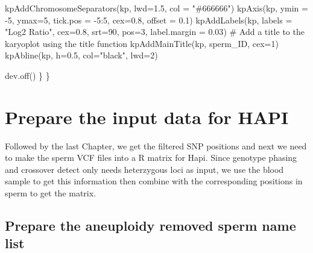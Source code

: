 \documentclass[
  letterpaper,
  DIV=11,
  numbers=noendperiod]{scrreprt}
\newenvironment{Shaded}{\begin{snugshade}}{\end{snugshade}}
\newcommand{\AttributeTok}[1]{\textcolor[rgb]{0.40,0.45,0.13}{#1}}
\newcommand{\CommentTok}[1]{\textcolor[rgb]{0.37,0.37,0.37}{#1}}
\newcommand{\DecValTok}[1]{\textcolor[rgb]{0.68,0.00,0.00}{#1}}
\newcommand{\FloatTok}[1]{\textcolor[rgb]{0.68,0.00,0.00}{#1}}
\newcommand{\FunctionTok}[1]{\textcolor[rgb]{0.28,0.35,0.67}{#1}}
\newcommand{\NormalTok}[1]{\textcolor[rgb]{0.00,0.23,0.31}{#1}}
\newcommand{\SpecialCharTok}[1]{\textcolor[rgb]{0.37,0.37,0.37}{#1}}
\newcommand{\StringTok}[1]{\textcolor[rgb]{0.13,0.47,0.30}{#1}}
\begin{document}
\begin{codelisting}
\begin{Shaded}
\begin{Highlighting}[]
  \FunctionTok{kpAddChromosomeSeparators}\NormalTok{(kp, }\AttributeTok{lwd=}\FloatTok{1.5}\NormalTok{, }\AttributeTok{col =} \StringTok{"\#666666"}\NormalTok{)}
  \FunctionTok{kpAxis}\NormalTok{(kp, }\AttributeTok{ymin =} \SpecialCharTok{{-}}\DecValTok{5}\NormalTok{, }\AttributeTok{ymax=}\DecValTok{5}\NormalTok{, }\AttributeTok{tick.pos =} \SpecialCharTok{{-}}\DecValTok{5}\SpecialCharTok{:}\DecValTok{5}\NormalTok{, }\AttributeTok{cex=}\FloatTok{0.8}\NormalTok{, }\AttributeTok{offset =} \FloatTok{0.1}\NormalTok{)}
  \FunctionTok{kpAddLabels}\NormalTok{(kp, }\AttributeTok{labels =} \StringTok{"Log2 Ratio"}\NormalTok{, }\AttributeTok{cex=}\FloatTok{0.8}\NormalTok{, }\AttributeTok{srt=}\DecValTok{90}\NormalTok{, }\AttributeTok{pos=}\DecValTok{3}\NormalTok{, }\AttributeTok{label.margin =} \FloatTok{0.03}\NormalTok{)}
  \CommentTok{\# Add a title to the karyoplot using the title function}
  \FunctionTok{kpAddMainTitle}\NormalTok{(kp, sperm\_ID, }\AttributeTok{cex=}\DecValTok{1}\NormalTok{)}
  \FunctionTok{kpAbline}\NormalTok{(kp, }\AttributeTok{h=}\FloatTok{0.5}\NormalTok{, }\AttributeTok{col=}\StringTok{"black"}\NormalTok{, }\AttributeTok{lwd=}\DecValTok{2}\NormalTok{)}

  
  \FunctionTok{dev.off}\NormalTok{()}
\NormalTok{  \}}
\NormalTok{\}}
\end{Highlighting}
\end{Shaded}

\end{codelisting}


\hypertarget{prepare-the-input-data-for-hapi}{%
\chapter{Prepare the input data for
HAPI}\label{prepare-the-input-data-for-hapi}}

Followed by the last Chapter, we get the filtered SNP positions and next
we need to make the sperm VCF files into a R matrix for Hapi. Since
genotype phasing and crossover detect only needs heterzygous loci as
input, we use the blood sample to get this information then combine with
the corresponding positions in sperm to get the matrix.

\hypertarget{prepare-the-aneuploidy-removed-sperm-name-list}{%
\section{Prepare the aneuploidy removed sperm name
list}\label{prepare-the-aneuploidy-removed-sperm-name-list}}
\end{document}
